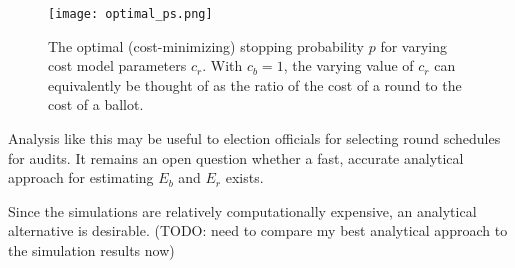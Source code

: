 \begin{figure}
\texttt{[image: optimal\_ps.png]}
\caption{The optimal (cost-minimizing) stopping probability $p$ for varying cost model parameters $c_r$. With $c_b=1$, the varying value of $c_r$ can equivalently be thought of as the ratio of the cost of a round to the cost of a ballot.}
\label{fig:optimal_ps}
\end{figure}

Analysis like this may be useful to election officials for selecting round schedules for audits. 
It remains an open question whether a fast, accurate analytical approach for estimating $E_b$ and $E_r$ exists.

Since the simulations are relatively computationally expensive, an analytical alternative is desirable. (TODO: need to compare my best analytical approach to the simulation results now)









